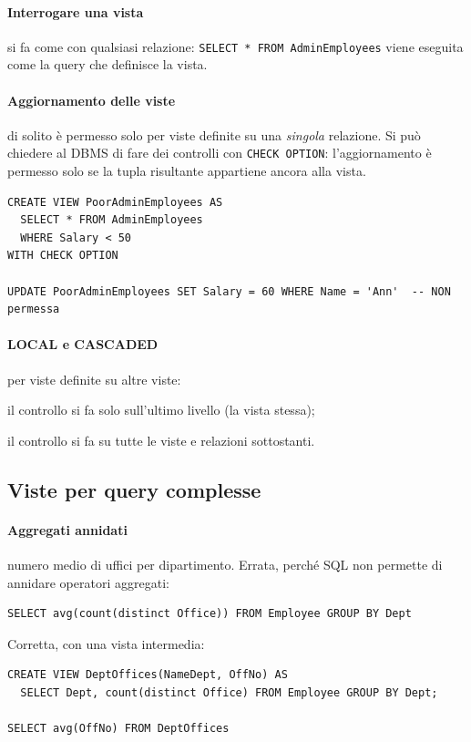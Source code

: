 \documentclass[a4paper,12pt]{article}
\begin{document}
\paragraph{Interrogare una vista} si fa come con qualsiasi relazione:
\texttt{SELECT * FROM AdminEmployees} viene eseguita come la query che
definisce la vista.

\paragraph{Aggiornamento delle viste} di solito è permesso solo per viste
definite su una \emph{singola} relazione. Si può chiedere al DBMS di fare dei
controlli con \texttt{CHECK OPTION}: l'aggiornamento è permesso solo se la tupla
risultante appartiene ancora alla vista.
\begin{verbatim}
CREATE VIEW PoorAdminEmployees AS
  SELECT * FROM AdminEmployees
  WHERE Salary < 50
WITH CHECK OPTION

UPDATE PoorAdminEmployees SET Salary = 60 WHERE Name = 'Ann'  -- NON permessa
\end{verbatim}

\paragraph{LOCAL e CASCADED} per viste definite su altre viste:
\begin{description}[style=nextline]
  \item[LOCAL] il controllo si fa solo sull'ultimo livello (la vista stessa);
  \item[CASCADED] il controllo si fa su tutte le viste e relazioni sottostanti.
\end{description}

\subsection{Viste per query complesse}

\paragraph{Aggregati annidati} numero medio di uffici per dipartimento.
Errata, perché SQL non permette di annidare operatori aggregati:
\begin{verbatim}
SELECT avg(count(distinct Office)) FROM Employee GROUP BY Dept
\end{verbatim}
Corretta, con una vista intermedia:
\begin{verbatim}
CREATE VIEW DeptOffices(NameDept, OffNo) AS
  SELECT Dept, count(distinct Office) FROM Employee GROUP BY Dept;

SELECT avg(OffNo) FROM DeptOffices
\end{verbatim}
\end{document}
